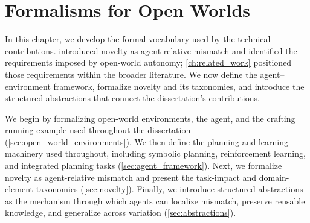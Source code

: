 \chapter{Formalisms for Open Worlds}
\label{ch:foundations}

In this chapter, we develop the formal vocabulary used by the technical contributions.
 introduced novelty as agent-relative mismatch and identified the requirements imposed by open-world autonomy; \cref{ch:related_work} positioned those requirements within the broader literature.
We now define the agent--environment framework, formalize novelty and its taxonomies, and introduce the structured abstractions that connect the dissertation's contributions.

We begin by formalizing open-world environments, the agent, and the crafting running example used throughout the dissertation (\cref{sec:open_world_environments}).
We then define the planning and learning machinery used throughout, including symbolic planning, reinforcement learning, and integrated planning tasks (\cref{sec:agent_framework}).
Next, we formalize novelty as agent-relative mismatch and present the task-impact and domain-element taxonomies (\cref{sec:novelty}).
Finally, we introduce structured abstractions as the mechanism through which agents can localize mismatch, preserve reusable knowledge, and generalize across variation (\cref{sec:abstractions}).










